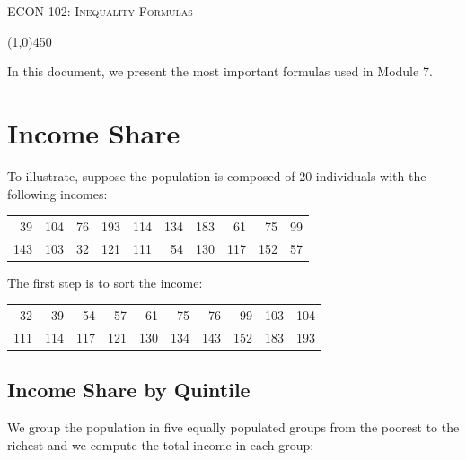 \documentclass[letterpaper]{article}\usepackage[]{graphicx}\usepackage[]{color}
\numberwithin{exer}{section}
\theoremstyle{nonumberplain}
\begin{document}
\noindent
 \textsc{\Large ECON 102: Inequality Formulas}\\[.1cm]
 \begin{center}
   \line(1,0){450}\\[0.2cm]
   \end{center}

In this document, we present the most important formulas used in
Module 7. 

\section*{Income Share}

To illustrate, suppose the population is composed of 20 individuals
with the following incomes:
\begin{center}
\begin{tabular}{rrrrrrrrrr}
  \hline
  \hline
 39 & 104 &  76 & 193 & 114 & 134 & 183 &  61 &  75 &  99 \\ 
  143 & 103 &  32 & 121 & 111 &  54 & 130 & 117 & 152 &  57 \\ 
   \hline
\end{tabular}

\end{center}
The first step is to sort the income:
\begin{center}
\begin{tabular}{rrrrrrrrrr}
  \hline
  \hline
 32 &  39 &  54 &  57 &  61 &  75 &  76 &  99 & 103 & 104 \\ 
  111 & 114 & 117 & 121 & 130 & 134 & 143 & 152 & 183 & 193 \\ 
   \hline
\end{tabular}

\end{center}

\subsection*{Income Share by Quintile}

We group the population in five equally populated groups from the
poorest to the richest and we compute the total income in each group:
\end{document}
